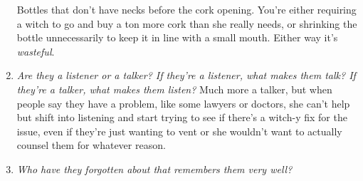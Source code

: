 \begin{enumerate}
      Bottles that don't have necks before the cork opening. You're either requiring a witch to go and buy a ton more cork than she really needs, or shrinking the bottle unnecessarily to keep it in line with a small mouth. Either way it's \emph{wasteful}.
    \item \textit{Are they a listener or a talker? If they’re a listener, what makes them talk? If they’re a talker, what makes them listen?}
      Much more a talker, but when people say they have a problem, like some lawyers or doctors, she can't help but shift into listening and start trying to see if there's a witch-y fix for the issue, even if they're just wanting to vent or she wouldn't want to actually counsel them for whatever reason. 
    \item \textit{Who have they forgotten about that remembers them very well?}
      

\end{enumerate}
